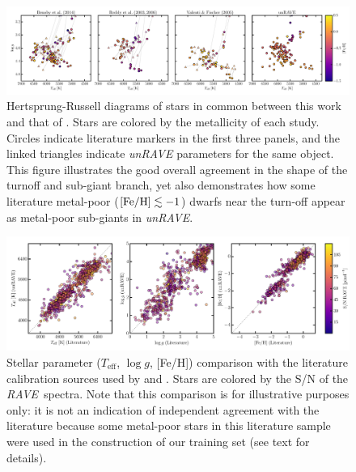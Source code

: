 \documentclass[preprint,trackchanges]{aastex}
\newcommand{\acronym}[1]{{\small{#1}}}
\newcommand{\project}[1]{\textsl{#1}}
\newcommand{\rave}{\project{\acronym{RAVE}}}
\newcommand{\teff}{T_{\mathrm{eff}}}
\newcommand{\logg}{\log g}
\begin{document}
\begin{figure}[p]
\includegraphics[width=\textwidth]{figures/gold-standard-hrd.pdf}
\caption{Hertsprung-Russell diagrams of stars in common between this work and that of \citet{Bensby_2014,Reddy_2003,Reddy_2006,Valenti_Fischer_2005}.  Stars are colored by the metallicity of each study. Circles indicate literature markers in the first three panels, and the linked triangles indicate \project{unRAVE} parameters for the same object. This figure illustrates the good overall agreement in the shape of the turnoff and sub-giant branch, yet also demonstrates how some literature metal-poor ($[{\rm Fe/H}] \lesssim -1$) dwarfs near the turn-off appear as metal-poor sub-giants in \project{unRAVE}.\label{fig:gold-standard-hrd}}
\end{figure}


\begin{figure}[p]
\includegraphics[width=\textwidth]{figures/kordopatis-calibration.pdf}
\caption{Stellar parameter ($\teff$, $\logg$, [Fe/H]) comparison with the literature calibration sources used by \citet{Kordopatis_2013} and \citet{Kunder_2016}. Stars are colored by the S/N of the \rave\ spectra. Note that this comparison is for illustrative purposes only: it is not an indication of independent agreement with the literature because some metal-poor stars in this literature sample were used in the construction of our training set (see text for details).\label{fig:kordopatis-calibration}}
\end{figure}
\end{document}

